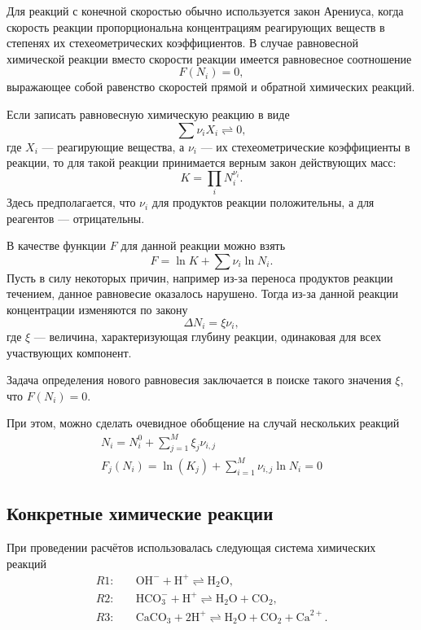 \documentclass[14pt,a4paper]{extarticle}
\begin{document}
Для реакций с конечной скоростью обычно используется закон Арениуса, когда скорость реакции пропорциональна концентрациям реагирующих веществ в степенях их стехеометрических коэффициентов.
В случае равновесной химической реакции вместо скорости реакции имеется равновесное соотношение
$$F(N_i) = 0,$$
выражающее собой равенство скоростей прямой и обратной химических реакций.

Если записать равновесную химическую реакцию в виде 
$$\sum{\nu_i X_i} \rightleftharpoons 0,$$
где $X_i$ --- реагирующие вещества, а $\nu_i$ --- их стехеометрические коэффициенты в реакции, то для такой реакции принимается верным закон действующих масс:
$$
K = \prod_i N_i^{\nu_i}.
$$
Здесь предполагается, что $\nu_i$ для продуктов реакции положительны, а для реагентов --- отрицательны. 

В качестве функции $F$ для данной реакции можно взять 
$$F = \ln{K} + \sum{\nu_i \ln{N_i}}.$$
Пусть в силу  некоторых причин, например из-за переноса продуктов реакции течением, данное равновесие оказалось нарушено. Тогда из-за данной реакции концентрации изменяются по закону $$\Delta N_i = \xi \nu_i,$$ где $\xi$ --- величина, характеризующая глубину реакции, одинаковая для всех участвующих компонент.

Задача определения нового равновесия заключается в поиске такого значения $\xi$, что $F(N_i) = 0$.

 При этом, можно сделать очевидное обобщение на случай нескольких реакций
\begin{gather*}
N_i = N_i^0 + \sum_{j=1}^{M} \xi_j\nu_{i,j}\\
F_j(N_i)=\ln(K_j) + \sum_{i=1}^{M} \nu_{i,j}\ln{N_i} = 0
\end{gather*}
 
\subsection{Конкретные химические реакции}

\newcommand{\OHm}{\text{OH}^-}
\newcommand{\Hp}{\text{H}^+}
\newcommand{\WAT}{\text{H}_2\text{O}}
\newcommand{\CARB}{\text{CO}_2}
\newcommand{\Catwop}{\text{Ca}^{2+}}
\newcommand{\Calcite}{\text{CaCO}_3}
\newcommand{\HCO}{\text{HCO}_3^{-}}
При проведении расчётов использовалась следующая система химических реакций
\begin{align*}
R1:&\quad \OHm + \Hp \rightleftharpoons \WAT,\\
R2:&\quad \HCO +\Hp \rightleftharpoons \WAT + \CARB,\\
R3:&\quad \Calcite + 2\Hp \rightleftharpoons \WAT + \CARB + \Catwop.
\end{align*}
\end{document}
